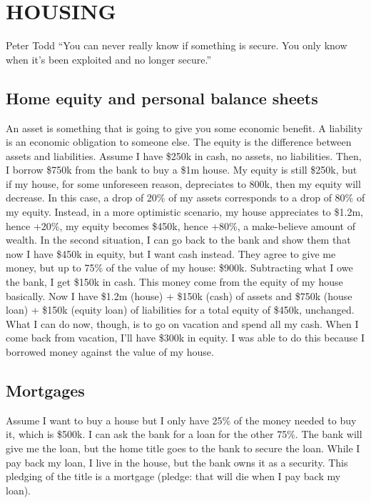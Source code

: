 \chapter{HOUSING}
\begin{chapquote}{Peter Todd}
``You can never really know if something is secure. You only know when it’s been exploited and no longer secure.''
\end{chapquote}

\section{Home equity and personal balance sheets}\label{home_equity}

An asset is something that is going to give you some economic benefit. A liability is an economic obligation to someone else. The equity is the difference between assets and liabilities.
Assume I have \$250k in cash, no assets, no liabilities. Then, I borrow \$750k from the bank to buy a \$1m house. My equity is still \$250k, but if my house, for some unforeseen reason, depreciates to 800k, then my equity will decrease. In this case, a drop of 20\% of my assets corresponds to a drop of 80\% of my equity.
Instead, in a more optimistic scenario, my house appreciates to \$1.2m, hence +20\%, my equity becomes \$450k, hence +80\%, a make-believe amount of wealth. 
In the second situation, I can go back to the bank and show them that now I have \$450k in equity, but I want cash instead. They agree to give me money, but up to 75\% of the value of my house: \$900k. Subtracting what I owe the bank, I get \$150k in cash. This money come from the equity of my house basically. Now I have \$1.2m (house) + \$150k (cash) of assets and \$750k (house loan) + \$150k (equity loan) of liabilities for a total equity of \$450k, unchanged. What I can do now, though, is to go on vacation and spend all my cash. When I come back from vacation, I'll have \$300k in equity. I was able to do this because I borrowed money against the value of my house.

\section{Mortgages} \label{mortgages}
Assume I want to buy a house but I only have 25\% of the money needed to buy it, which is \$500k. I can ask the bank for a loan for the other 75\%. The bank will give me the loan, but the home title goes to the bank to secure the loan. While I pay back my loan, I live in the house, but the bank owns it as a security. This pledging of the title is a mortgage (pledge: that will die when I pay back my loan).

